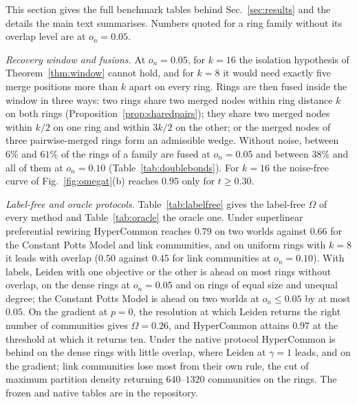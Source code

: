 
This section gives the full benchmark tables behind Sec.~\ref{sec:results} and the
details the main text summarises. Numbers quoted for a ring family without its overlap
level are at $o_n=0.05$.

\emph{Recovery window and fusions.} At $o_n=0.05$, for $k=16$ the isolation hypothesis
of Theorem~\ref{thm:window} cannot hold, and for $k=8$ it would need exactly five merge
positions more than $k$ apart on every ring. Rings are then fused inside the window in
three ways: two rings share two merged nodes within ring distance $k$ on both rings
(Proposition~\ref{prop:sharedpairs}); they share two merged nodes within $k/2$ on one
ring and within $3k/2$ on the other; or the merged nodes of three pairwise-merged rings
form an admissible wedge. Without noise, between $6\%$ and $61\%$ of the rings of a family
are fused at $o_n=0.05$ and between $38\%$ and all of them at $o_n=0.10$
(Table~\ref{tab:doublebonds}). For $k=16$ the noise-free curve of
Fig.~\ref{fig:omegat}(b) reaches $0.95$ only for $t\ge0.30$.



\emph{Label-free and oracle protocols.} Table~\ref{tab:labelfree} gives the label-free
$\Omega$ of every method and Table~\ref{tab:oracle} the oracle one. Under superlinear
preferential rewiring HyperCommon reaches $0.79$ on two worlds against $0.66$ for the
Constant Potts Model and link communities, and on uniform rings with $k=8$ it leads with
overlap ($0.50$ against $0.45$ for link communities at $o_n=0.10$). With labels, Leiden
with one objective or the other is ahead on most rings without overlap, on the dense
rings at $o_n=0.05$ and on rings of equal size and unequal degree; the Constant Potts
Model is ahead on two worlds at $o_n\le0.05$ by at most $0.05$. On the gradient at
$p=0$, the resolution at which Leiden returns the right number of communities gives
$\Omega=0.26$, and HyperCommon attains $0.97$ at the threshold at which it returns ten.
Under the native protocol HyperCommon is behind on the dense rings with little overlap,
where Leiden at $\gamma=1$ leads, and on the gradient; link communities lose most from
their own rule, the cut of maximum partition density returning $640$--$1320$
communities on the rings. The frozen and native tables are in the repository.

